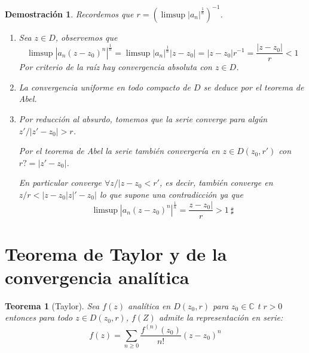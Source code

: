 \documentclass[12pt]{book}
\newtheorem{theorem}{Teorema}[chapter]
\newtheorem*{dem}{Demostración}
\newcommand{\C}{\mathbb{C}}
\begin{document}
\begin{dem}
Recordemos que $r = \left(\limsup|a_n|^{\frac{1}{n}}\right)^{-1}$.
\begin{enumerate} 
\item Sea $z\in  D$, observemos que 
$$\limsup|a_n(z-z_0)^n|^{\frac{1}{n}} = \limsup|a_n|^{\frac{1}{n}}|z-z_0| = |z-z_0|r^{-1} = \frac{|z-z_0|}{r}< 1 $$
Por criterio de la raíz hay convergencia absoluta con $z\in D$.

\item La convergencia uniforme en todo compacto de $D$ se deduce por el teorema de Abel.

\item Por reducción al absurdo, tomemos que la serie converge para algún $z' / |z'-z_0|>r$.

Por el teorema de Abel la serie también convergería en $z\in D(z_0,r')$ con $r? = |z'-z_0|$.

En particular converge $\forall z / |z-z_0 <r'$, es decir, también converge en $z/ r<|z-z_0|z|'-z_0|$ lo que supone una contradicción ya que 
$$\limsup|a_n(z-z_0)^n|^{\frac{1}{n}} = \frac{z-z_0|}{r}>1\ \sharp$$
\end{enumerate}
\end{dem}


\section{Teorema de Taylor y de la convergencia analítica}


\begin{theorem}[Taylor]
Sea $f(z)$ analítica en $D(z_0,r)$ para $z_0\in\C$ t $r>0$ entonces para todo $z \in D(z_0,r)$, $f(Z)$ admite la representación en serie:
$$f(z) = \sum_{n\geq 0} \frac{f^{(n)}(z_0)}{n!}(z-z_0)^n$$
\end{theorem}
\end{document}
